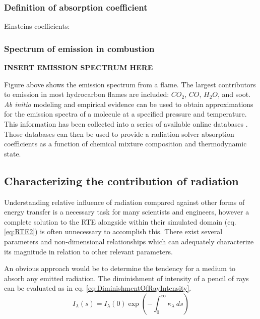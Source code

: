 \subsubsection{Definition of absorption coefficient}
Einsteins coefficients: \cite{Modest2013RadiativeTransfer,Pai1966RadiationDynamics,Hanson2016SpectroscopyGases}

\subsubsection{Spectrum of emission in combustion}
\textbf{INSERT EMISSION SPECTRUM HERE}

Figure above shows the emission spectrum from a flame. The largest contributors to emission in most hydrocarbon flames are included: $CO_2$, $CO$, $H_2O$, and soot.
\textit{Ab initio} modeling and empirical evidence can be used to obtain approximations for the emission spectra of a molecule at a specified pressure and temperature. This information has been collected into a series of available online databases \cite{Rothman2010HITEMPDatabase}. 
Those databases can then be used to provide a radiation solver absorption coefficients as a function of chemical mixture composition and thermodynamic state.

\subsection{Characterizing the contribution of radiation}
Understanding relative influence of radiation compared against other forms of energy transfer is a necessary task for many scientists and engineers, however a complete solution to the RTE alongside within their simulated domain (eq. \ref{eq:RTE2}) is often unnecessary to accomplish this. 
There exist several parameters and non-dimensional relationships which can adequately characterize its magnitude in relation to other relevant parameters.

An obvious approach would be to determine the tendency for a medium to absorb any emitted radiation. The diminishment of intensity of a pencil of rays can be evaluated as in eq. \ref{eq:DiminishmentOfRayIntensity}.
\begin{equation}
    I_\lambda{}(s)=I_\lambda{}(0)\exp{\left(-\int^\infty_0{\kappa{}_\lambda{}~ds}\right)}
    \label{eq:DiminishmentOfRayIntensity}
\end{equation}

